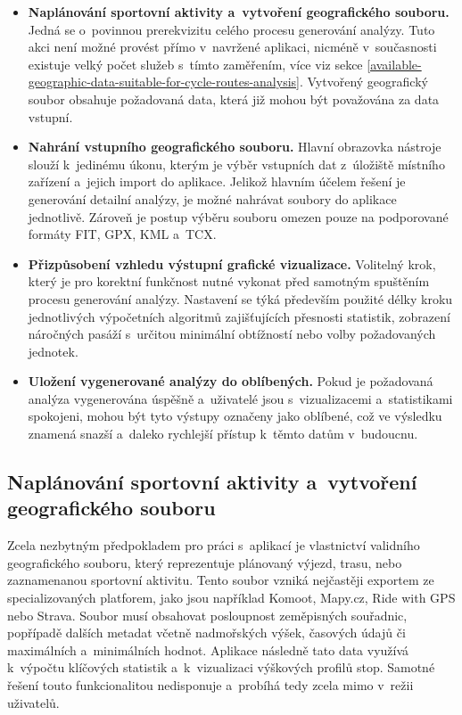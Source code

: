 \begin{itemize}
    \item \textbf{Naplánování sportovní aktivity a~vytvoření geografického souboru.}
    Jedná se o~povinnou prerekvizitu celého procesu generování analýzy.
    Tuto akci není možné provést přímo v~navržené aplikaci, nicméně v~současnosti existuje velký počet služeb s~tímto zaměřením, více viz sekce \ref{available-geographic-data-suitable-for-cycle-routes-analysis}.
    Vytvořený geografický soubor obsahuje požadovaná data, která již mohou být považována za data vstupní.
    \item \textbf{Nahrání vstupního geografického souboru.}
    Hlavní obrazovka nástroje slouží k~jedinému úkonu, kterým je výběr vstupních dat z~úložiště místního zařízení a~jejich import do aplikace.
    Jelikož hlavním účelem řešení je generování detailní analýzy, je možné nahrávat soubory do aplikace jednotlivě.
    Zároveň je postup výběru souboru omezen pouze na podporované formáty FIT, GPX, KML a~TCX.
    \item \textbf{Přizpůsobení vzhledu výstupní grafické vizualizace.}
    Volitelný krok, který je pro korektní funkčnost nutné vykonat před samotným spuštěním procesu generování analýzy.
    Nastavení se týká především použité délky kroku jednotlivých výpočetních algoritmů zajišťujících přesnosti statistik, zobrazení náročných pasáží s~určitou minimální obtížností nebo volby požadovaných jednotek.
    \item \textbf{Uložení vygenerované analýzy do oblíbených.}
    Pokud je požadovaná analýza vygenerována úspěšně a~uživatelé jsou s~vizualizacemi a~statistikami spokojeni, mohou být tyto výstupy označeny jako oblíbené, což ve výsledku znamená snazší a~daleko rychlejší přístup k~těmto datům v~budoucnu.
\end{itemize}

\subsection{Naplánování sportovní aktivity a~vytvoření geografického souboru}
\label{planning-sports-activities-and-creating-geographic-files}

Zcela nezbytným předpokladem pro práci s~aplikací je vlastnictví validního geografického souboru, který reprezentuje plánovaný výjezd, trasu, nebo zaznamenanou sportovní aktivitu.
Tento soubor vzniká nejčastěji exportem ze specializovaných platforem, jako jsou například Komoot, Mapy.cz, Ride with GPS nebo Strava.
Soubor musí obsahovat posloupnost zeměpisných souřadnic, popřípadě dalších metadat včetně nadmořských výšek, časových údajů či maximálních a~minimálních hodnot.
Aplikace následně tato data využívá k~výpočtu klíčových statistik a~k~vizualizaci výškových profilů stop.
Samotné řešení touto funkcionalitou nedisponuje a~probíhá tedy zcela mimo v~režii uživatelů.

